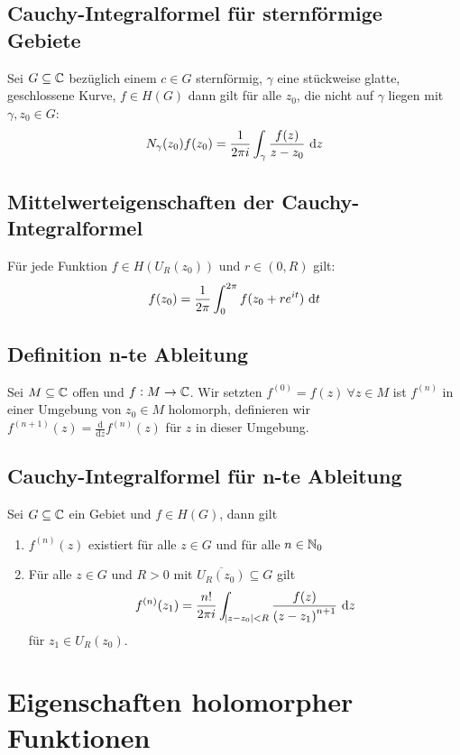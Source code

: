 \subsection{Cauchy-Integralformel für sternförmige Gebiete}
Sei $G \subseteq \mathbb{C}$ bezüglich einem $c \in G$ sternförmig, $\gamma$ eine stückweise glatte, geschlossene Kurve,
$f \in H(G)$ dann gilt für alle $z_0$, die nicht auf $\gamma$ liegen mit $\gamma, z_0 \in G$:
\begin{equation*}
    N_\gamma (z_0) f(z_0) = \frac{1}{2 \pi i} \int_\gamma \frac{f(z)}{z-z_0} \text{ d}z
\end{equation*}

\subsection{Mittelwerteigenschaften der Cauchy-Integralformel}
Für jede Funktion $f \in H(U_R(z_0))$ und $r \in (0, R)$ gilt:
\begin{equation*}
    f(z_0) = \frac{1}{2 \pi} \int_0^{2\pi} f(z_0 + r e^{it}) \text{ d}t
\end{equation*}

\subsection{Definition n-te Ableitung}
Sei $M \subseteq \mathbb{C}$ offen und $f: M \to \mathbb{C}$. Wir setzten $f^{(0)} = f(z)\ \forall z \in M$ ist $f^{(n)}$ in einer
Umgebung von $z_0 \in M$ holomorph, definieren wir 
$f^{(n+1)}(z) = \frac{\text{d}}{\text{d}z} f^{(n)}(z)$ für $z$ in dieser Umgebung.

\subsection{Cauchy-Integralformel für n-te Ableitung}
Sei $G \subseteq \mathbb{C}$ ein Gebiet und $f \in H(G)$, dann gilt
\begin{enumerate}
    \item $f^{(n)}(z)$ existiert für alle $z \in G$ und für alle $n \in \mathbb{N}_0$
    \item Für alle $z \in G$ und $R > 0$ mit $\overline{U_R(z_0)} \subseteq G$ gilt
        \begin{equation*}
            f^{(n)}(z_1) = \frac{n!}{2 \pi i} \int_{\abs{z-z_0} < R} \frac{f(z)}{{(z-z_1)}^{n+1}} \text{ d}z
        \end{equation*}
        für $z_1 \in U_R(z_0)$.
\end{enumerate}

\section{Eigenschaften holomorpher Funktionen}
